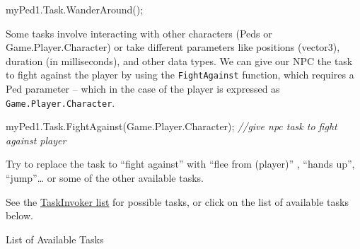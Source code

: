 \documentclass[
  openany]{book}
\newenvironment{Shaded}{\begin{snugshade}}{\end{snugshade}}
\newcommand{\CommentTok}[1]{\textcolor[rgb]{0.56,0.35,0.01}{\textit{#1}}}
\newcommand{\FunctionTok}[1]{\textcolor[rgb]{0.00,0.00,0.00}{#1}}
\newcommand{\NormalTok}[1]{#1}
\begin{document}
\begin{Shaded}
\begin{Highlighting}[]
\NormalTok{myPed1.}\FunctionTok{Task}\NormalTok{.}\FunctionTok{WanderAround}\NormalTok{();}
\end{Highlighting}
\end{Shaded}

Some tasks involve interacting with other characters (Peds or Game.Player.Character) or take different parameters like positions (vector3), duration (in milliseconds), and other data types.
We can give our NPC the task to fight against the player by using the \texttt{FightAgainst} function, which requires a Ped parameter -- which in the case of the player is expressed as \texttt{Game.Player.Character}.

\begin{Shaded}
\begin{Highlighting}[]
\NormalTok{myPed1.}\FunctionTok{Task}\NormalTok{.}\FunctionTok{FightAgainst}\NormalTok{(Game.}\FunctionTok{Player}\NormalTok{.}\FunctionTok{Character}\NormalTok{); }\CommentTok{//give npc task to fight against player}
\end{Highlighting}
\end{Shaded}

Try to replace the task to ``fight against'' with ``flee from (player)'' , ``hands up'', ``jump''\ldots{} or some of the other available tasks.

See the \href{https://nitanmarcel.github.io/shvdn-docs.github.io/class_g_t_a_1_1_task_invoker.html}{TaskInvoker list} for possible tasks, or click on the list of available tasks below.

List of Available Tasks
\end{document}
